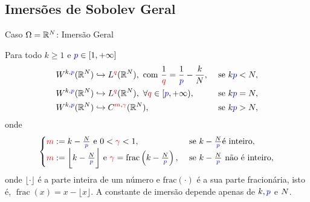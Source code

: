 \subsection*{Imersões de Sobolev Geral}
\begin{frame}{Caso \(\Omega=\mathbb{R}^N\): Imersão Geral}
\begin{teo} Para todo \(k\geq 1\) e \({\color{blue} p }\in [1,+\infty]\)
\begin{align*}
& W^{k,{\color{blue} p }}(\mathbb{R}^N)\hookrightarrow L^{\color{red} q }(\mathbb{R}^N), \text{ com } \frac{1}{{\color{red} q }}=\frac{1}{{\color{blue} p }}-\frac{k}{N},  &
 \text{ se } k{\color{blue} p }<N,\\
& W^{k,{\color{blue} p }}(\mathbb{R}^N)\hookrightarrow L^{\color{red} q }(\mathbb{R}^N),\ \forall {\color{red} q }\in [{\color{blue} p },+\infty),& \text{ se }  k{\color{blue} p }=N,\\
& W^{k,{\color{blue} p }}(\mathbb{R}^N)\hookrightarrow C^{{\color{red} m },{\color{red} \gamma }}(\mathbb{R}^N),
& \text{ se }  k{\color{blue} p }>N,
\end{align*}
onde 
\[
\begin{cases}
{\color{red}m}:= k-\frac{N}{{\color{blue} p}} 
\text{ e } 0< {\color{red} \gamma }<1,
& \text{ se } k-\frac{N}{{\color{blue} p }} \text{é inteiro},\\
{\color{red}m}:=\bigg\lfloor k-\frac{N}{{\color{blue} p }}\bigg\rfloor 
\text{ e } {\color{red} \gamma }=  \operatorname{frac}\left(k-\frac{N}{{\color{blue} p}}\right), 
& \text{ se } k-\frac{N}{{\color{blue} p }} \text{ não é inteiro},
\end{cases}
\]
onde \(\lfloor\cdot \rfloor\) é a parte inteira de um número e \(\operatorname{frac(\cdot)}\) é a sua parte fracionária, isto é, \(\operatorname{frac}(x)=x-\lfloor x\rfloor\). A constante de imersão depende apenas de \(k, {\color{blue} p }\) e \(N\).
\end{teo}


\end{frame}


